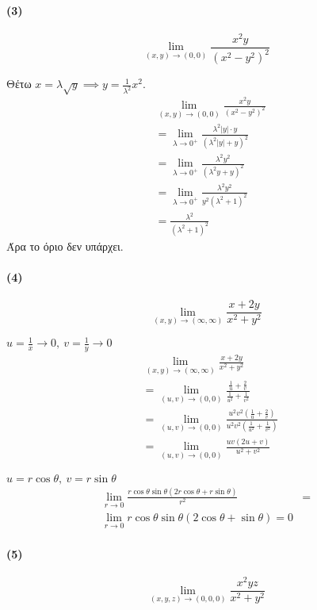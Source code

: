 \documentclass[11pt,a4paper,titlepage,draft]{article}
\begin{document}
\paragraph{(3)}
\[
\lim_{(x,y) \to (0,0)} \frac{x^2y}{(x^2-y^2)^2}
\]

Θέτω \(x = \lambda \sqrt y \implies y = \frac{1}{\lambda^2} x^2 \).
\begin{align*}
&\lim_{(x,y) \to (0,0)} \frac{x^2y}{(x^2-y^2)^2} \\
&= \lim_{\lambda \to 0^+} \frac{\lambda^2 |y| \cdot y}{\left( \lambda^2 |y| + y \right)^2} \\
&= \lim_{\lambda \to 0^+} \frac{\lambda^2 y^2}{\left( \lambda^2 y + y \right)^2} \\
&= \lim_{\lambda \to 0^+} \frac{\lambda^2 y^2}{y^ 2 \left( \lambda^2 +1 \right)^2} \\
&= \frac{\lambda^2}{(\lambda^2+1)^2}
\end{align*}
Άρα το όριο δεν υπάρχει.

\paragraph{(4)}
\[
\lim_{(x,y) \to (\infty,\infty)} \frac{x+2y}{x^2+y^2}
\]

\(u=\frac{1}{x} \to 0, \ v = \frac{1}{y} \to 0\)
\begin{align*}
&\lim_{(x,y) \to (\infty,\infty)} \frac{x+2y}{x^2+y^2}
\\ &=
\lim_{(u,v) \to (0,0)} \frac{\frac{1}{u} + \frac{2}{v}}{\frac{1}{u^2}+ \frac{1}{v^2}}
\\ &=
\lim_{(u,v) \to (0,0)} \frac{u^2v^2 \left( \frac{1}{u}+\frac{2}{v} \right)}{u^2v^2 \left( \frac{1}{u^2}+\frac{1}{v^2} \right)}
\\ &=
\lim_{(u,v) \to (0,0)} \frac{uv (2u+v)}{u^2+v^2}
\end{align*}

\(u =r\cos \theta,\ v=r\sin\theta\)
\begin{align*}
\lim_{r \to 0} \frac{r\cos\theta\sin\theta (2r \cos\theta + r \sin\theta)}{r^2} &= \\
\lim_{r \to 0} r\cos\theta\sin\theta (2\cos\theta+\sin\theta) = 0
\end{align*}


\paragraph{(5)}
\[
\lim_{(x,y,z) \to (0,0,0)} \frac{x^2yz}{x^2+y^2}
\]
\end{document}
